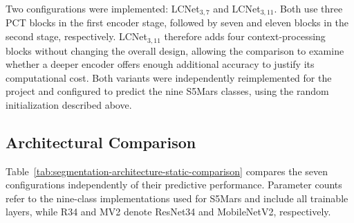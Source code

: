 Two configurations were implemented: LCNet\(_{3,7}\) and LCNet\(_{3,11}\). Both use three PCT blocks in the first encoder stage, followed by seven and eleven blocks in the second stage, respectively. LCNet\(_{3,11}\) therefore adds four context-processing blocks without changing the overall design, allowing the comparison to examine whether a deeper encoder offers enough additional accuracy to justify its computational cost. Both variants were independently reimplemented for the project and configured to predict the nine S5Mars classes, using the random initialization described above.

\subsection{Architectural Comparison}

Table~\ref{tab:segmentation-architecture-static-comparison} compares the seven configurations independently of their predictive performance. Parameter counts refer to the nine-class implementations used for S5Mars and include all trainable layers, while R34 and MV2 denote ResNet34 and MobileNetV2, respectively.

